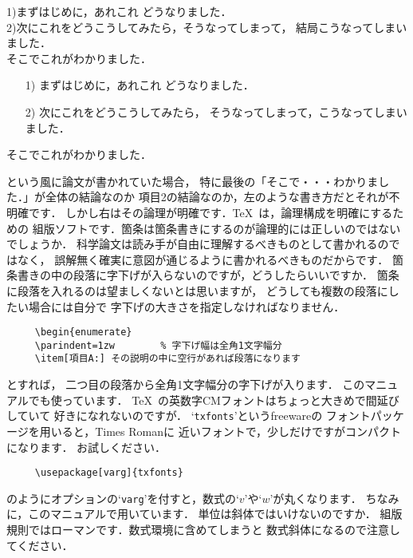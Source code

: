 \documentclass[onecolumn]{jsce}  %
\begin{document}
\begin{Enumerate}
\noindent\mbox{}\hfill
\begin{minipage}[t]{.4\textwidth}
1)まずはじめに，あれこれ
どうなりました．\\
2)次にこれをどうこうしてみたら，そうなってしまって，
結局こうなってしまいました．\\
そこでこれがわかりました．
\end{minipage}
\hfill
\begin{minipage}[t]{.4\textwidth}
\begin{enumerate}
\item[1)] まずはじめに，あれこれ
どうなりました．
\item[2)] 次にこれをどうこうしてみたら，
そうなってしまって，こうなってしまいました．
\end{enumerate}
そこでこれがわかりました．
\end{minipage}
\hfill\mbox{}

\medskip
\noindent
という風に論文が書かれていた場合，
特に最後の「そこで・・・わかりました．」が全体の結論なのか
項目2の結論なのか，左のような書き方だとそれが不明確です．
しかし右はその論理が明確です．\TeX\ は，論理構成を明確にするための
組版ソフトです．箇条は箇条書きにするのが論理的には正しいのではないでしょうか．
科学論文は読み手が自由に理解するべきものとして書かれるのではなく，
誤解無く確実に意図が通じるように書かれるべきものだからです．
%
\Qitem 箇条書きの中の段落に字下げが入らないのですが，どうしたらいいですか．
\Aitem 箇条に段落を入れるのは望ましくないとは思いますが，
どうしても複数の段落にしたい場合には自分で
字下げの大きさを指定しなければなりません．

\renewcommand{\baselinestretch}{0.75}\small\normalsize
\begin{verbatim}
     \begin{enumerate}
     \parindent=1zw        % 字下げ幅は全角1文字幅分
     \item[項目A:] その説明の中に空行があれば段落になります
\end{verbatim}
\renewcommand{\baselinestretch}{1}\small\normalsize
とすれば，
二つ目の段落から全角1文字幅分の字下げが入ります．
このマニュアルでも使っています．
%
\Qitem \TeX\ の英数字CMフォントはちょっと大きめで間延びしていて
好きになれないのですが．
\Aitem `{\tt txfonts}'というfreewareの
フォントパッケージを用いると，Times Romanに
近いフォントで，少しだけですがコンパクトになります．
お試しください．
\begin{verbatim}
     \usepackage[varg]{txfonts}
\end{verbatim}
のようにオプションの`{\tt varg}'を付すと，数式の`$v$'や`$w$'が丸くなります．
ちなみに，このマニュアルで用いています．
%
\Qitem 単位は斜体ではいけないのですか．
\Aitem 組版規則ではローマンです．数式環境に含めてしまうと
数式斜体になるので注意してください．


\end{Enumerate}
\end{document}
